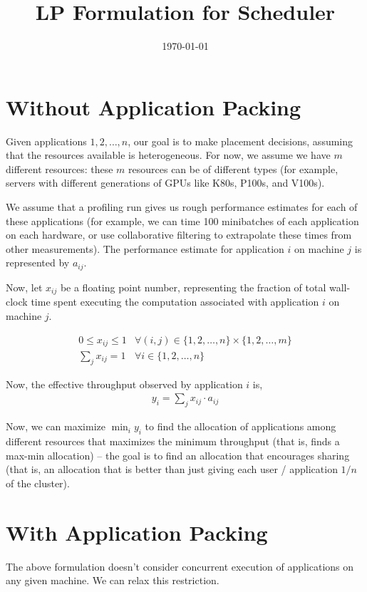 \documentclass{article}
\title{LP Formulation for Scheduler}
\date{\today}
\begin{document}
\maketitle

\section{Without Application Packing}
Given applications $1, 2, \ldots, n$, our goal is to make placement
decisions, assuming that the resources available is heterogeneous. For now, we
assume we have $m$ different resources: these $m$ resources can be of different types (for
example, servers with different generations of GPUs like K80s, P100s, and V100s).

We assume that a profiling run gives us rough performance estimates for each
of these applications (for example, we can time 100 minibatches of each application
on each hardware, or use collaborative filtering to extrapolate these
times from other measurements). The performance estimate for application $i$
on machine $j$ is represented by $a_{ij}$.

Now, let $x_{ij}$ be a floating point number, representing the fraction of
total wall-clock time spent executing the computation associated with
application $i$ on machine $j$.

\begin{eqnarray}
0 \leq x_{ij} \leq 1 & \forall (i,j) \in \{1, 2, \ldots, n\} \times \{1, 2, \ldots, m\} \nonumber  \\
\sum_j x_{ij} = 1 & \forall i \in \{1, 2, \ldots, n\} \nonumber
\end{eqnarray}

Now, the effective throughput observed by application $i$ is,
\begin{eqnarray}
y_i = \sum_j x_{ij} \cdot a_{ij} \nonumber
\end{eqnarray}

Now, we can maximize $\min_i y_i$ to find the allocation of applications
among different resources that maximizes the minimum throughput (that is,
finds a max-min allocation) -- the goal is to find an allocation that encourages
sharing (that is, an allocation that is better than just giving each user / application
$1/n$ of the cluster).

\section{With Application Packing}
The above formulation doesn't consider concurrent execution of applications
on any given machine. We can relax this restriction.
\end{document}
